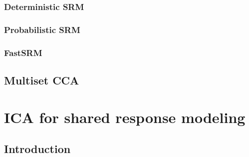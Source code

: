 \documentclass[12pt]{report}
\begin{document}
\subsection{Deterministic SRM}
\subsection{Probabilistic SRM}
\subsection{FastSRM}
\section{Multiset CCA}

\chapter{ICA for shared response modeling}
\section{Introduction}
\label{sec:intro}

\end{document}
